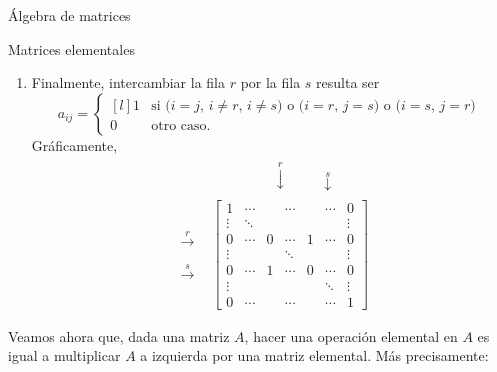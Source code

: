 \begin{chapter}{\'Algebra de matrices}
\begin{section}{Matrices elementales}
\begin{enumerate}
                
                \item Finalmente, intercambiar la fila $r$ por la fila $s$ resulta ser
                \begin{equation}\label{elem-tipo-3}
                a_{ij} = \left\{ 
                \begin{matrix*}[l]
                1 &\text{si ($i=j$, $i \ne r$, $i \ne s$) o ($i=r$, $j=s$) o ($i=s$, $j=r$) }\\
                0 \quad&\text{otro caso.}
                \end{matrix*}\right.
                \end{equation}
                    Gráficamente, 
                \begin{align*}
                &\begin{matrix}
                {}^{}&{}^{}&{}^{}&{}^{}&{}^{}&\overset{r}{\downarrow}&{}^{}&{}^{}&{}^{}{}^{}\overset{s}{\downarrow}&{}^{}
                \end{matrix} \\
                \begin{matrix}
                {}^{}\\{}^{}\\
                \overset{r}{\to}\\
                {}^{}\\
                \overset{s}{\to}\\{}^{}\\
                {}^{}
                \end{matrix}
                &\begin{bmatrix}
                1 & \cdots &  &\cdots &&\cdots& 0  \\
                \vdots  & \ddots  & & &&& \vdots \\
                0 & \cdots &0 &\cdots&1&\cdots &0 \\
                \vdots  &   & &\ddots &&& \vdots \\
                0  & \cdots  &1 &\cdots &0& \cdots& 0 \\
                \vdots  &   & & &&\ddots& \vdots \\
                0  & \cdots  & &\cdots &&\cdots& 1
                \end{bmatrix}
                \end{align*}
            \end{enumerate}
            
            Veamos ahora que, dada una matriz $A$,   hacer una operación elemental en $A$ es igual a multiplicar $A$ a izquierda por una matriz elemental. Más precisamente:
            

\end{section}
\end{chapter}
